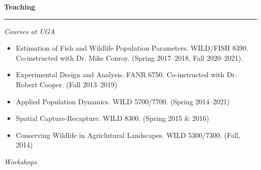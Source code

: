\vspace{0.5cm}






{\large \bf Teaching} \\
\rule[3mm]{\textwidth}{0.3mm}

{\it Courses at UGA}

\begin{itemize}

\item Estimation of Fish and Wildlife Population Parameters. WILD/FISH
  8390. Co-instructed with Dr. Mike Conroy. (Spring 2017--2018, Fall
  2020--2021). 

\item Experimental Design and Analysis. FANR 6750. Co-instructed with
  Dr. Robert Cooper. (Fall 2013--2019)

\item Applied Population Dynamics. WILD 5700/7700. (Spring 2014--2021)

\item Spatial Capture-Recapture. WILD 8300. (Spring 2015 \& 2016)

\item Conserving Wildlife in Agriclutural Landscapes. WILD
  5300/7300. (Fall, 2014) 

\end{itemize}

\vspace{0.5cm}

{\it Workshops}

